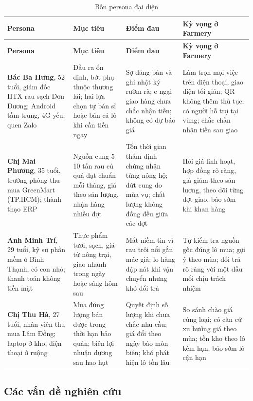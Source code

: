 \begingroup
\tblsetup\tblzebra
\begin{longtable}{L{2.60cm} L{3.90cm} L{4.20cm} L{4.20cm}}
\caption{Bốn persona đại diện}
\label{tab:personas} \\
\toprule
{}
\textbf{Persona} & \textbf{Mục tiêu} & \textbf{Điểm đau} & \textbf{Kỳ vọng ở Farmery} \\
\midrule
\endfirsthead
\toprule
{}
\textbf{Persona} & \textbf{Mục tiêu} & \textbf{Điểm đau} & \textbf{Kỳ vọng ở Farmery} \\
\midrule
\endhead
\bottomrule
\endfoot
\textbf{Bác Ba Hưng}, 52 tuổi, giám đốc HTX rau sạch Đơn Dương; Android tầm trung, 4G yếu, quen Zalo & Đầu ra ổn định, bớt phụ thuộc thương lái; hai lựa chọn tự bán sỉ hoặc bán cả lô khi cần tiền ngay & Sợ đăng bán và ghi nhật ký rườm rà; e ngại giao hàng chưa chắc nhận tiền; không có dự báo giá & Làm trọn mọi việc trên điện thoại, giao diện tối giản; QR không thêm thủ tục; có người hỗ trợ tại vùng; chắc chắn nhận tiền sau giao \\
\textbf{Chị Mai Phương}, 35 tuổi, trưởng phòng thu mua GreenMart (TP.HCM); thành thạo ERP & Nguồn cung 5--10 tấn rau củ quả đạt chuẩn mỗi tháng, giá theo sản lượng, nhận hàng nhiều đợt & Tốn thời gian thẩm định chứng nhận từng nông hộ; đứt cung do mùa vụ; chất lượng không đồng đều giữa các đợt & Hỏi giá linh hoạt, hợp đồng rõ ràng, giá giảm theo sản lượng, theo dõi từng đợt giao, báo sớm khi khan hàng \\
\textbf{Anh Minh Trí}, 29 tuổi, kỹ sư phần mềm ở Bình Thạnh, có con nhỏ; thanh toán không tiền mặt & Thực phẩm tươi, sạch, giá từ nông trại, giao nhanh trong ngày hoặc sáng hôm sau & Mất niềm tin vì rau trôi nổi gắn mác giả; lo hàng dập nát khi vận chuyển nhưng khó đổi trả & Tự kiểm tra nguồn gốc đúng lô mua; gợi ý theo mùa; đổi trả rõ ràng với một đầu mối chịu trách nhiệm \\
\textbf{Chị Thu Hà}, 27 tuổi, nhân viên thu mua Lâm Đồng; laptop ở kho, điện thoại ở ruộng & Mua đúng lượng bán được trong thời hạn bảo quản; biên lợi nhuận dương sau hao hụt & Quyết định số lượng khi chưa chắc nhu cầu; giá đổi theo ngày bào mòn biên; khó phát hiện lô tồn lâu & So sánh chào giá cùng loại; có căn cứ xu hướng giá theo mùa; tồn kho theo lô kèm hạn; báo sớm lô cận hạn \\
\end{longtable}
\endgroup

\subsection{Các vấn đề nghiên cứu}
\label{subsec:vandenghiencuu}

